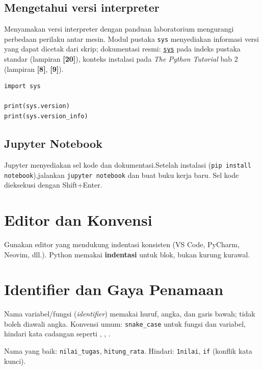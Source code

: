 \documentclass[../main.tex]{subfiles}
\begin{document}
\subsection{Mengetahui versi interpreter}

\noindent Menyamakan versi interpreter dengan panduan laboratorium mengurangi perbedaan perilaku antar mesin. Modul pustaka \texttt{sys} menyediakan informasi versi yang dapat dicetak dari skrip; dokumentasi resmi: \href{https://docs.python.org/3/library/sys.html}{\texttt{sys}} pada indeks pustaka standar (lampiran \textbf{[20]}), konteks instalasi pada \textit{The Python Tutorial} bab 2 (lampiran \textbf{[8]}, \textbf{[9]}).

\begin{lstlisting}[caption=Cek versi Python dari skrip]
import sys

print(sys.version)
print(sys.version_info)
\end{lstlisting}

\subsection{Jupyter Notebook}

Jupyter menyediakan sel kode dan dokumentasi.\newline Setelah instalasi (\texttt{pip install notebook}),\newline jalankan \texttt{jupyter notebook} dan buat buku kerja baru. Sel kode dieksekusi dengan Shift+Enter.

\section{Editor dan Konvensi}

Gunakan editor yang mendukung indentasi konsisten (VS Code, PyCharm, Neovim, dll.). Python memakai \textbf{indentasi} untuk blok, bukan kurung kurawal.

\section{Identifier dan Gaya Penamaan}

Nama variabel/fungsi (\textit{identifier}) memakai huruf, angka, dan garis bawah; tidak boleh diawali angka. Konvensi umum: \texttt{snake\_case} untuk fungsi dan variabel, hindari kata cadangan seperti , , .

\begin{contoh}
Nama yang baik: \texttt{nilai\_tugas}, \texttt{hitung\_rata}. Hindari: \texttt{1nilai}, \texttt{if} (konflik kata kunci).
\end{contoh}
\end{document}
